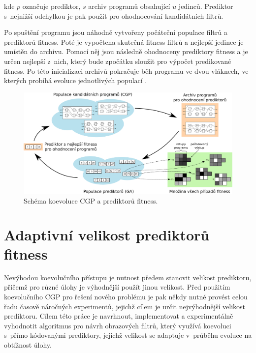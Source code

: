 \documentclass[czech]{ExcelAtFIT} %
\begin{document}
\noindent{}kde $p$ označuje prediktor, $s$ archiv programů obsahující $u$ jedinců. Prediktor s~nejnižší odchylkou je pak použit pro ohodnocování kandidátních filtrů.

Po spuštění programu jsou náhodně vytvořeny po\-čá\-teč\-ní populace filtrů a prediktorů fitness. Poté je vypočtena skutečná fitness filtrů a nejlepší jedinec je umís\-těn do archivu. Pomocí něj jsou následně ohod\-no\-ceny prediktory fitness a je určen nejlepší z~nich, který bude zpočátku sloužit pro výpočet predikované fitness. Po této inicializaci archivů pokračuje běh programu ve dvou vláknech, ve kterých probíhá evoluce jed\-not\-li\-vých populací \cite{SikuPPSN}.

\begin{figure}[t]
    \centering\includegraphics[width=0.9\linewidth]{images/coevolution-if.pdf}
    \caption{Schéma koevoluce CGP a prediktorů fitness.}
    \label{fig:CoevolutionScheme}
\end{figure}



\section{Adaptivní velikost prediktorů fitness}
\label{sec:AdaptiveSize}

Nevýhodou koevolučního přístupu je nutnost předem stanovit velikost prediktoru, přičemž pro různé úlohy je výhodnější použít jinou velikost. Před použitím koevolučního CGP pro řešení nového problému je pak někdy nutné provést celou řadu časově náročných experimentů, jejichž cílem je určit nejvýhodnější velikost prediktoru. Cílem této práce je navrhnout, implementovat a experimentálně vyhodnotit algoritmus pro návrh obrazových filtrů, který využívá koevoluci s~přímo kódovanými prediktory, jejichž velikost se adaptuje v~průběhu evoluce na obtížnost úlohy.
\end{document}
